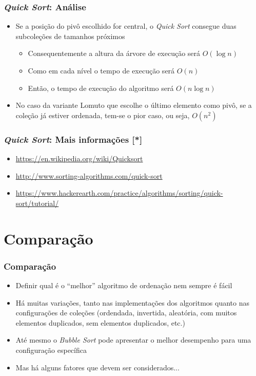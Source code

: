 \documentclass[aspectratio=169]{beamer}
\begin{document}
\begin{frame}[fragile]\frametitle{\emph{Quick Sort}: Análise}
\begin{itemize}
	\item Se a posição do pivô escolhido for central, o \emph{Quick Sort} consegue duas subcoleções de tamanhos próximos
	\begin{itemize}
		\item Consequentemente a altura da árvore de execução será $O(\log{n})$
		\item Como em cada nível o tempo de execução será $O(n)$
		\item Então, o tempo de execução do algoritmo será $O(n\log{n})$
	\end{itemize}
	\item No caso da variante Lomuto que escolhe o último elemento como pivô, se a coleção já estiver ordenada, tem-se o pior caso, ou seja, $O(n^2)$
\end{itemize}
\end{frame}

\begin{frame}[fragile]\frametitle{\emph{Quick Sort}: Mais informações [*]}
\begin{itemize}
	\item \url{https://en.wikipedia.org/wiki/Quicksort}
	\item \url{http://www.sorting-algorithms.com/quick-sort}
	\item \url{https://www.hackerearth.com/practice/algorithms/sorting/quick-sort/tutorial/}
\end{itemize}
\end{frame}

\section{Comparação}

\begin{frame}[fragile]\frametitle{Comparação}
\begin{itemize}
	\item Definir qual é o ``melhor'' algoritmo de ordenação nem sempre é fácil
	\item Há muitas variações, tanto nas implementações dos algoritmos quanto nas configurações de coleções (ordendada, invertida, aleatória, com muitos elementos duplicados, sem elementos duplicados, etc.)
	\item Até mesmo o \emph{Bubble Sort} pode apresentar o melhor desempenho para uma configuração específica
	\item Mas há alguns fatores que devem ser considerados...
\end{itemize}
\end{frame}
\end{document}
